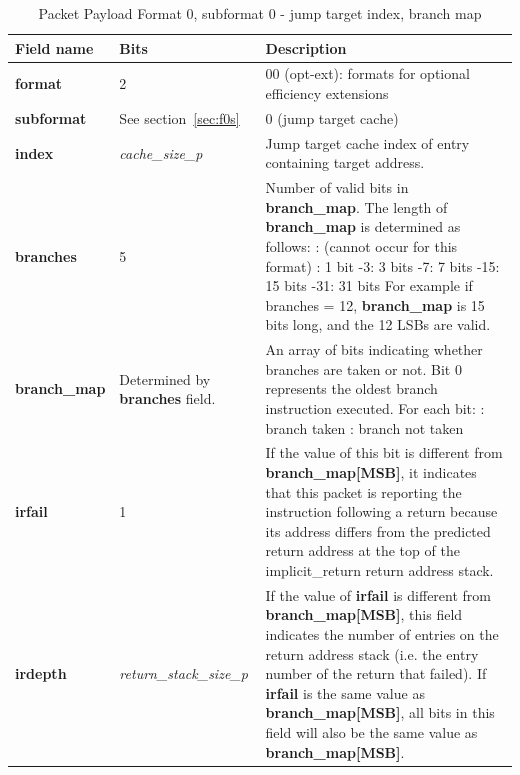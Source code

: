 \begin{table}[htp]
  \centering
  \caption{Packet Payload Format 0, subformat 0 - jump target index, branch map}
  \label{tab:te_inst0-0-cache-map}
  \begin{tabulary}{\textwidth}{|l|p{35mm}|p{80mm}|}
    \hline
    {\bf Field name} & {\bf Bits} & {\bf Description} \\
    \hline
    \textbf{format}	& 2	& 00 (opt-ext): formats for optional efficiency extensions\\
    \hline
     \textbf{subformat}  & See section~\ref{sec:f0s} & 0 (jump target cache)\\
     \hline
    \textbf{index} & \textit {\textit{cache\_size\_p}} & 
              Jump target cache index of entry containing target address.\\ 
    \hline
    \textbf{branches} & 5 & Number of valid bits in \textbf{branch\_map}. The length of \textbf{branch\_map} is determined as follows: :	   (cannot occur for this format) :	   1 bit -3:   3 bits -7:   7 bits -15:  15 bits -31: 31 bits \newline
    For example if branches = 12, \textbf{branch\_map} is 15 bits long, and the 12 LSBs are valid. \\
    \hline
    \textbf{branch\_map} & Determined by \newline 
                 \textbf{branches} field. & 
                 An array of bits indicating whether branches are taken or not.\newline
    Bit 0 represents the oldest branch instruction executed.   For each bit: : branch taken : branch not taken \\
    \hline
    \textbf{irfail}	& 1 & 
                If the value of this bit is different from \textbf{branch\_map[MSB]}, it indicates that this
                packet is reporting the instruction following a return because its address differs from 
                the predicted return address at the top of the implicit\_return return address stack.\\
    \hline
    \textbf{irdepth}	& \textit {return\_stack\_size\_p} & 
                If the value of \textbf{irfail} is different from \textbf{branch\_map[MSB]}, this field indicates 
                the number of entries on the return address stack (i.e. the entry number of the return that
                failed).  If \textbf{irfail} is the same value as \textbf{branch\_map[MSB]}, all bits in this field 
                will also be the same value as \textbf{branch\_map[MSB]}. \\
    \hline
  \end{tabulary}
\end{table}

